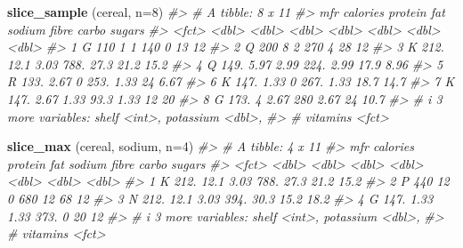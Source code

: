 \documentclass[
]{book}
\newenvironment{Shaded}{\begin{snugshade}}{\end{snugshade}}
\newcommand{\AttributeTok}[1]{\textcolor[rgb]{0.13,0.29,0.53}{#1}}
\newcommand{\CommentTok}[1]{\textcolor[rgb]{0.56,0.35,0.01}{\textit{#1}}}
\newcommand{\DecValTok}[1]{\textcolor[rgb]{0.00,0.00,0.81}{#1}}
\newcommand{\FunctionTok}[1]{\textcolor[rgb]{0.13,0.29,0.53}{\textbf{#1}}}
\newcommand{\NormalTok}[1]{#1}
\begin{document}
\begin{Shaded}
\begin{Highlighting}[]
\FunctionTok{slice\_sample}\NormalTok{ (cereal, }\AttributeTok{n=}\DecValTok{8}\NormalTok{)}
\CommentTok{\#\textgreater{} \# A tibble: 8 x 11}
\CommentTok{\#\textgreater{}   mfr   calories protein   fat sodium fibre carbo sugars}
\CommentTok{\#\textgreater{}   \textless{}fct\textgreater{}    \textless{}dbl\textgreater{}   \textless{}dbl\textgreater{} \textless{}dbl\textgreater{}  \textless{}dbl\textgreater{} \textless{}dbl\textgreater{} \textless{}dbl\textgreater{}  \textless{}dbl\textgreater{}}
\CommentTok{\#\textgreater{} 1 G         110     1     1     140    0     13    12   }
\CommentTok{\#\textgreater{} 2 Q         200     8     2     270    4     28    12   }
\CommentTok{\#\textgreater{} 3 K         212.   12.1   3.03  788.  27.3   21.2  15.2 }
\CommentTok{\#\textgreater{} 4 Q         149.    5.97  2.99  224.   2.99  17.9   8.96}
\CommentTok{\#\textgreater{} 5 R         133.    2.67  0     253.   1.33  24     6.67}
\CommentTok{\#\textgreater{} 6 K         147.    1.33  0     267.   1.33  18.7  14.7 }
\CommentTok{\#\textgreater{} 7 K         147.    2.67  1.33   93.3  1.33  12    20   }
\CommentTok{\#\textgreater{} 8 G         173.    4     2.67  280    2.67  24    10.7 }
\CommentTok{\#\textgreater{} \# i 3 more variables: shelf \textless{}int\textgreater{}, potassium \textless{}dbl\textgreater{},}
\CommentTok{\#\textgreater{} \#   vitamins \textless{}fct\textgreater{}}

\FunctionTok{slice\_max}\NormalTok{ (cereal, sodium, }\AttributeTok{n=}\DecValTok{4}\NormalTok{)}
\CommentTok{\#\textgreater{} \# A tibble: 4 x 11}
\CommentTok{\#\textgreater{}   mfr   calories protein   fat sodium fibre carbo sugars}
\CommentTok{\#\textgreater{}   \textless{}fct\textgreater{}    \textless{}dbl\textgreater{}   \textless{}dbl\textgreater{} \textless{}dbl\textgreater{}  \textless{}dbl\textgreater{} \textless{}dbl\textgreater{} \textless{}dbl\textgreater{}  \textless{}dbl\textgreater{}}
\CommentTok{\#\textgreater{} 1 K         212.   12.1   3.03   788.  27.3  21.2   15.2}
\CommentTok{\#\textgreater{} 2 P         440    12     0      680   12    68     12  }
\CommentTok{\#\textgreater{} 3 N         212.   12.1   3.03   394.  30.3  15.2   18.2}
\CommentTok{\#\textgreater{} 4 G         147.    1.33  1.33   373.   0    20     12  }
\CommentTok{\#\textgreater{} \# i 3 more variables: shelf \textless{}int\textgreater{}, potassium \textless{}dbl\textgreater{},}
\CommentTok{\#\textgreater{} \#   vitamins \textless{}fct\textgreater{}}
\end{Highlighting}
\end{Shaded}
\end{document}
